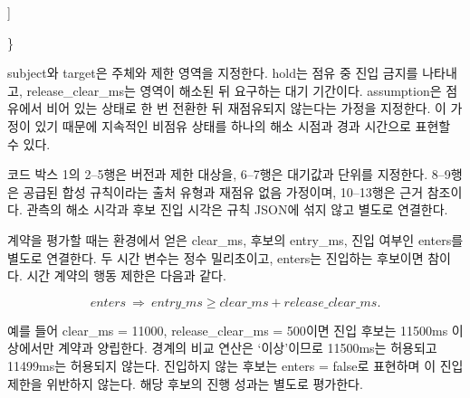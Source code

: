 \documentclass[11pt,a4paper]{article}
\begin{document}
\begin{minipage}{\linewidth}
{\begin{minipage}{\dimexpr\linewidth-2\fboxsep-2\fboxrule\relax}
\noindent{}\hspace{.8em}\parbox[t]{\dimexpr\linewidth-2.8em\relax}{\raggedright\ttfamily\fontsize{8.2}{10.5}\selectfont \hspace*{1.0em}]\strut}\par\vspace{1pt}
\noindent{}\hspace{.8em}\parbox[t]{\dimexpr\linewidth-2.8em\relax}{\raggedright\ttfamily\fontsize{8.2}{10.5}\selectfont \hspace*{0.0em}\}\strut}\par\vspace{1pt}
\end{minipage}}\par\medskip
\end{minipage}\par\medskip

{\ttfamily\small subject}와 {\ttfamily\small target}은 주체와 제한 영역을 지정한다. {\ttfamily\small hold}는 점유 중 진입 금지를 나타내고, {\ttfamily\small release\_clear\_ms}는 영역이 해소된 뒤 요구하는 대기 기간이다. {\ttfamily\small assumption}은 점유에서 비어 있는 상태로 한 번 전환한 뒤 재점유되지 않는다는 가정을 지정한다. 이 가정이 있기 때문에 지속적인 비점유 상태를 하나의 해소 시점과 경과 시간으로 표현할 수 있다.\par

코드 박스 1의 2–5행은 버전과 제한 대상을, 6–7행은 대기값과 단위를 지정한다. 8–9행은 공급된 합성 규칙이라는 출처 유형과 재점유 없음 가정이며, 10–13행은 근거 참조이다. 관측의 해소 시각과 후보 진입 시각은 규칙 JSON에 섞지 않고 별도로 연결한다.\par

계약을 평가할 때는 환경에서 얻은 {\ttfamily\small clear\_ms}, 후보의 {\ttfamily\small entry\_ms}, 진입 여부인 {\ttfamily\small enters}를 별도로 연결한다. 두 시간 변수는 정수 밀리초이고, {\ttfamily\small enters}는 진입하는 후보이면 참이다. 시간 계약의 행동 제한은 다음과 같다.\par

\[\mathit{enters}\ \Longrightarrow\ \mathit{entry\_ms}\geq\mathit{clear\_ms}+\mathit{release\_clear\_ms}.\]

예를 들어 {\ttfamily\small clear\_ms = 11000}, {\ttfamily\small release\_clear\_ms = 500}이면 진입 후보는 11500ms 이상에서만 계약과 양립한다. 경계의 비교 연산은 ‘이상’이므로 11500ms는 허용되고 11499ms는 허용되지 않는다. 진입하지 않는 후보는 {\ttfamily\small enters = false}로 표현하며 이 진입 제한을 위반하지 않는다. 해당 후보의 진행 성과는 별도로 평가한다.\par
\end{document}
